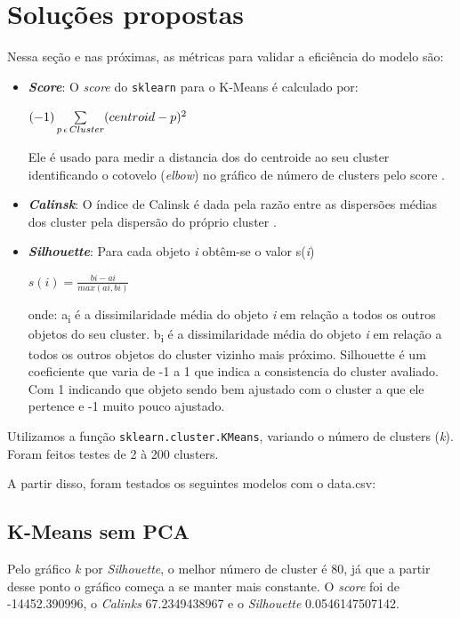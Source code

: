 \documentclass[conference]{IEEEtran}
\begin{document}
\section{Soluções propostas}
Nessa seção e nas próximas, as métricas para validar a eficiência do modelo são:
\begin{itemize}

\item \textit{\textbf{Score}}: O \textit{score} do \texttt{sklearn} para o K-Means é calculado por:
\begin{center}
 $(-1) \sum\limits_ {p  \thinspace \epsilon \thinspace Cluster} (centroid - p)^2 $
\end{center} 
Ele é usado para medir a distancia dos do centroide ao seu cluster identificando o cotovelo (\textit{elbow}) no gráfico de número de clusters pelo score \cite{b11}.

\item \textit{\textbf{Calinsk}}: O índice de Calinsk é dada pela razão entre as dispersões médias dos cluster pela dispersão do próprio cluster \cite{b12}.

\item \textit{\textbf{Silhouette}}: Para cada objeto \textit{i} obtêm-se o valor s(\textit{i})

\begin{center}
$s(\mathit{i}) = \frac{b \mathit{i} - a \mathit{i}}{max(a \mathit{i}, b\mathit{i})}$
\end{center}

onde:
  a\textsubscript{i} é a dissimilaridade média do objeto \textit{i} em relação a todos os outros objetos do seu cluster.
  b\textsubscript{i} é a dissimilaridade média do objeto \textit{i} em relação a todos os outros objetos do cluster vizinho mais próximo. Silhouette é um coeficiente que varia de -1 a 1 que indica a consistencia do cluster avaliado. Com 1 indicando que objeto sendo  bem ajustado com o cluster a que ele pertence e -1 muito pouco ajustado\cite{b13}.\\
\end{itemize}
 
Utilizamos a função \texttt{sklearn.cluster.KMeans}, variando o número de clusters (\textit{k}). Foram feitos testes de 2 à 200 clusters. 

A partir disso, foram testados os seguintes modelos com o data.csv:\\

\subsection{K-Means sem PCA}
Pelo gráfico \textit{k} por \textit{Silhouette}, o melhor número de cluster é 80, já que a partir desse ponto o gráfico começa a se manter mais constante. O \textit{score} foi de -14452.390996, o \textit{Calinks} 67.2349438967 e o \textit{Silhouette} 0.0546147507142.
\end{document}
